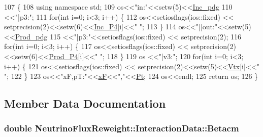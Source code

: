 \begin{DoxyCode}
107                                                          \{
108     \textcolor{keyword}{using namespace }std;
109     os<<\textcolor{stringliteral}{"in:"}<<setw(5)<<\hyperlink{class_neutrino_flux_reweight_1_1_interaction_data_a3dd2f3bb4bc4d092b7ec53906c00473e}{Inc\_pdg}
110       <<\textcolor{stringliteral}{"|p3:"};
111     \textcolor{keywordflow}{for}(\textcolor{keywordtype}{int} i=0; i<3; i++) \{
112       os<<setiosflags(ios::fixed) << setprecision(2)<<setw(6)<<\hyperlink{class_neutrino_flux_reweight_1_1_interaction_data_a0f74cee2bb5b42e953d6e5f7c6e06920}{Inc\_P4}[i]<<\textcolor{stringliteral}{" "};
113     \}
114     os<<\textcolor{stringliteral}{"||out:"}<<setw(5)<<\hyperlink{class_neutrino_flux_reweight_1_1_interaction_data_aaf39f277663067e29fa997b208b09441}{Prod\_pdg}
115       <<\textcolor{stringliteral}{"|p3:"}<<setiosflags(ios::fixed) << setprecision(2);
116     \textcolor{keywordflow}{for}(\textcolor{keywordtype}{int} i=0; i<3; i++) \{
117       os<<setiosflags(ios::fixed) << setprecision(2)<<setw(6)<<\hyperlink{class_neutrino_flux_reweight_1_1_interaction_data_aeb1a90172c41b31676c9b9f2587684b4}{Prod\_P4}[i]<<\textcolor{stringliteral}{" "};
118     \}
119     os <<\textcolor{stringliteral}{"|v3:"};
120     \textcolor{keywordflow}{for}(\textcolor{keywordtype}{int} i=0; i<3; i++) \{
121       os<<setiosflags(ios::fixed) << setprecision(2)<<setw(5)<<\hyperlink{class_neutrino_flux_reweight_1_1_interaction_data_a682fc7155e7fabd38431d6aff21ebdd1}{Vtx}[i]<<\textcolor{stringliteral}{" "};
122     \}
123     os<<\textcolor{stringliteral}{"xF,pT:"}<<\hyperlink{class_neutrino_flux_reweight_1_1_interaction_data_afd47c094f4fa78df269a0cfd5de2d6cd}{xF}<<\textcolor{stringliteral}{","}<<\hyperlink{class_neutrino_flux_reweight_1_1_interaction_data_a769e8d7c2862f32c3526e4fce963ec79}{Pt};
124     os<<endl;
125     \textcolor{keywordflow}{return} os;
126   \}
\end{DoxyCode}


\subsection{Member Data Documentation}
\hypertarget{class_neutrino_flux_reweight_1_1_interaction_data_ae6057e9361dbfa16fb2f1ea21798b16f}{
\subsubsection[{Betacm}]{\setlength{\rightskip}{0pt plus 5cm}double Neutrino\-Flux\-Reweight\-::\-Interaction\-Data\-::\-Betacm}}\label{class_neutrino_flux_reweight_1_1_interaction_data_ae6057e9361dbfa16fb2f1ea21798b16f}



